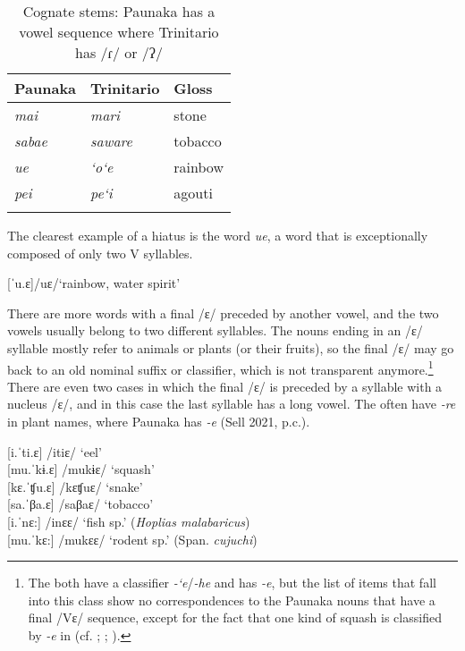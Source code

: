 \begin{table}
\caption{Cognate stems: Paunaka has a vowel sequence where Trinitario has /ɾ/ or /ʔ/}

\begin{tabular}{lll}
\lsptoprule
Paunaka & Trinitario & Gloss \\
\midrule
\textit{mai} & \textit{mari} & stone\\
\textit{sabae} & \textit{saware} & tobacco\\
\textit{ue} & \textit{‘o‘e} & rainbow\\
\textit{pei} & \textit{pe‘i} & agouti\\
\lspbottomrule
\end{tabular}

\label{table:PauTriniComparison-VV}
\end{table}



The clearest example of a hiatus is the word \textit{ue}, a word that is exceptionally composed of only two V syllables.

\ea\label{ex:w-2}%
[ˈu.ɛ]\tab /uɛ/\tab ‘rainbow, water spirit’\\%
\xe

There are more words with a final /ɛ/ preceded by another vowel, and the two vowels usually belong to two different syllables. The nouns ending in an /ɛ/ syllable mostly refer to animals or plants (or their fruits), so the final /ɛ/ may go back to an old nominal suffix or classifier, which is not transparent anymore.\footnote{The  both have a classifier \textit{-‘e}/\textit{-he} and  has \textit{-e}, but the list of items that fall into this class show no correspondences to the Paunaka nouns that have a final /Vɛ/ sequence, except for the fact that one kind of squash is classified by \textit{-e} in  (cf. \citealt[232--235]{OlzaZubiri2004}; \citealt[464]{Rose2019b}; \citealt[141--142]{Terhart2016}).} There are even two cases in which the final /ɛ/ is preceded by a syllable with a nucleus /ɛ/, and in this case the last syllable has a long vowel. The  often have \textit{-re} in plant names, where Paunaka has \textit{-e} (Sell 2021, p.c.).

\ea %
	{[}i.ˈti.ɛ] \tab /itiɛ/ \tab\tab ‘eel’\\
	{[}mu.ˈkɨ.ɛ] \tab /mukɨɛ/ \tab ‘squash’\\
	{[}kɛ.ˈʧu.ɛ] \tab /kɛʧuɛ/ \tab ‘snake’\\
	{[}sa.ˈβa.ɛ] \tab /saβaɛ/ \tab ‘tobacco’\\
	{[}i.ˈnɛ:] \tab /inɛɛ/ \tab\tab ‘fish sp.’ (\textit{Hoplias malabaricus}) \\
	{[}mu.ˈkɛ:] \tab /mukɛɛ/ \tab ‘rodent sp.’ (Span. \textit{cujuchi}) \\%
\xe


